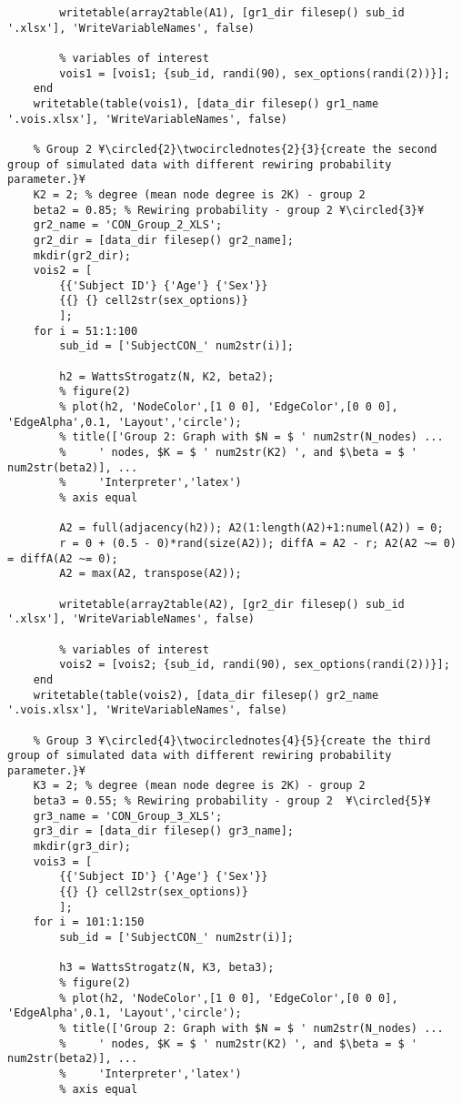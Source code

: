 \documentclass{tufte-handout}
\begin{document}
\begin{lstlisting}
        writetable(array2table(A1), [gr1_dir filesep() sub_id '.xlsx'], 'WriteVariableNames', false)

        % variables of interest
        vois1 = [vois1; {sub_id, randi(90), sex_options(randi(2))}];
    end
    writetable(table(vois1), [data_dir filesep() gr1_name '.vois.xlsx'], 'WriteVariableNames', false)

    % Group 2 ¥\circled{2}\twocirclednotes{2}{3}{create the second group of simulated data with different rewiring probability parameter.}¥
    K2 = 2; % degree (mean node degree is 2K) - group 2
    beta2 = 0.85; % Rewiring probability - group 2 ¥\circled{3}¥
    gr2_name = 'CON_Group_2_XLS';
    gr2_dir = [data_dir filesep() gr2_name];
    mkdir(gr2_dir);
    vois2 = [
        {{'Subject ID'} {'Age'} {'Sex'}}
        {{} {} cell2str(sex_options)}
        ];
    for i = 51:1:100
        sub_id = ['SubjectCON_' num2str(i)];

        h2 = WattsStrogatz(N, K2, beta2);
        % figure(2)
        % plot(h2, 'NodeColor',[1 0 0], 'EdgeColor',[0 0 0], 'EdgeAlpha',0.1, 'Layout','circle');
        % title(['Group 2: Graph with $N = $ ' num2str(N_nodes) ...
        %     ' nodes, $K = $ ' num2str(K2) ', and $\beta = $ ' num2str(beta2)], ...
        %     'Interpreter','latex')
        % axis equal

        A2 = full(adjacency(h2)); A2(1:length(A2)+1:numel(A2)) = 0;
        r = 0 + (0.5 - 0)*rand(size(A2)); diffA = A2 - r; A2(A2 ~= 0) = diffA(A2 ~= 0);
        A2 = max(A2, transpose(A2));

        writetable(array2table(A2), [gr2_dir filesep() sub_id '.xlsx'], 'WriteVariableNames', false)

        % variables of interest
        vois2 = [vois2; {sub_id, randi(90), sex_options(randi(2))}];
    end
    writetable(table(vois2), [data_dir filesep() gr2_name '.vois.xlsx'], 'WriteVariableNames', false)

    % Group 3 ¥\circled{4}\twocirclednotes{4}{5}{create the third group of simulated data with different rewiring probability parameter.}¥
    K3 = 2; % degree (mean node degree is 2K) - group 2
    beta3 = 0.55; % Rewiring probability - group 2  ¥\circled{5}¥
    gr3_name = 'CON_Group_3_XLS';
    gr3_dir = [data_dir filesep() gr3_name];
    mkdir(gr3_dir);
    vois3 = [
        {{'Subject ID'} {'Age'} {'Sex'}}
        {{} {} cell2str(sex_options)}
        ];
    for i = 101:1:150
        sub_id = ['SubjectCON_' num2str(i)];

        h3 = WattsStrogatz(N, K3, beta3);
        % figure(2)
        % plot(h2, 'NodeColor',[1 0 0], 'EdgeColor',[0 0 0], 'EdgeAlpha',0.1, 'Layout','circle');
        % title(['Group 2: Graph with $N = $ ' num2str(N_nodes) ...
        %     ' nodes, $K = $ ' num2str(K2) ', and $\beta = $ ' num2str(beta2)], ...
        %     'Interpreter','latex')
        % axis equal


\end{lstlisting}
\end{document}
